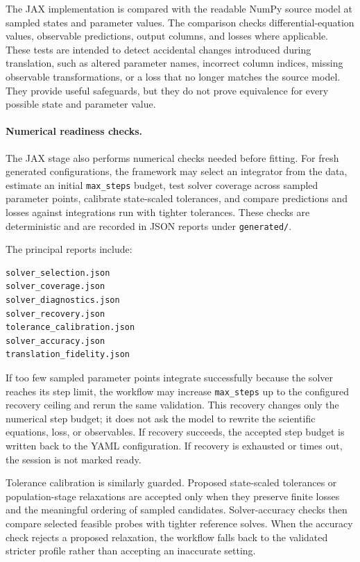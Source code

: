 The JAX implementation is compared with the readable NumPy source model at
sampled states and parameter values. The comparison checks differential-equation
values, observable predictions, output columns, and losses where applicable.
These tests are intended to detect accidental changes introduced during
translation, such as altered parameter names, incorrect column indices, missing
observable transformations, or a loss that no longer matches the source model.
They provide useful safeguards, but they do not prove equivalence for every
possible state and parameter value.

\paragraph{Numerical readiness checks.}
The JAX stage also performs numerical checks needed before fitting. For fresh
generated configurations, the framework may select an integrator from the data,
estimate an initial \texttt{max\_steps} budget, test solver coverage across
sampled parameter points, calibrate state-scaled tolerances, and compare
predictions and losses against integrations run with tighter tolerances. These
checks are deterministic and are recorded in JSON reports under
\texttt{generated/}.

The principal reports include:

\begin{verbatim}
solver_selection.json
solver_coverage.json
solver_diagnostics.json
solver_recovery.json
tolerance_calibration.json
solver_accuracy.json
translation_fidelity.json
\end{verbatim}

If too few sampled parameter points integrate successfully because the solver
reaches its step limit, the workflow may increase \texttt{max\_steps} up to the
configured recovery ceiling and rerun the same validation. This recovery changes
only the numerical step budget; it does not ask the model to rewrite the
scientific equations, loss, or observables. If recovery succeeds, the accepted
step budget is written back to the YAML configuration. If recovery is exhausted
or times out, the session is not marked ready.

Tolerance calibration is similarly guarded. Proposed state-scaled tolerances or
population-stage relaxations are accepted only when they preserve finite losses
and the meaningful ordering of sampled candidates. Solver-accuracy checks then
compare selected feasible probes with tighter reference solves. When the
accuracy check rejects a proposed relaxation, the workflow falls back to the
validated stricter profile rather than accepting an inaccurate setting.

